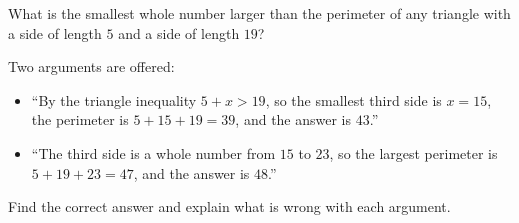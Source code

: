What is the smallest whole number larger than the perimeter of any triangle with a side of length $5$ and a side of length $19$?

Two arguments are offered:
\begin{itemize}
\item[(i)] ``By the triangle inequality $5+x>19$, so the smallest third side is $x=15$, the perimeter is $5+15+19=39$, and the answer is $43$.''
\item[(ii)] ``The third side is a whole number from $15$ to $23$, so the largest perimeter is $5+19+23=47$, and the answer is $48$.''
\end{itemize}
Find the correct answer and explain what is wrong with each argument.
